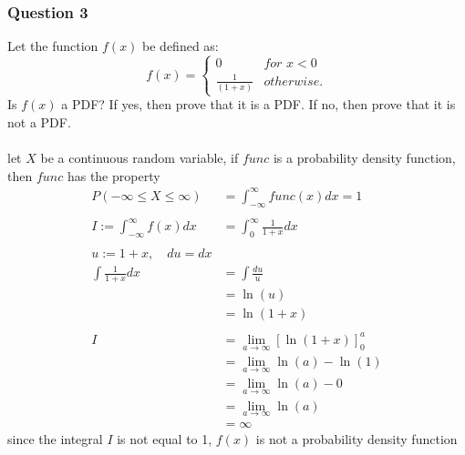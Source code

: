 \documentclass[12pt, border = 4pt, multi]{article} %
\begin{document}
\subsubsection*{Question 3}
Let the function $f(x)$ be defined as: 
\begin{equation}
    f(x) = 
    \left\{ \begin{array}{cl}
    0 & for \,\, x < 0 \\ 
\frac{1}{(1+x)} & otherwise.
\end{array} \right.
\end{equation}
Is $f(x)$ a PDF? If yes, then 
prove that it is a PDF. 
If no, then 
prove that it is not a PDF.\\
\\
let $X$ be a continuous random variable, if $func$ is a probability density function, then $func$ has the property
\begin{align*}
P(-\infty \leq X \leq \infty) &= \int_{-\infty} ^ {\infty} func(x) dx = 1\\
\\
I := \int_{-\infty} ^ {\infty} f(x) dx &= \int_0 ^ {\infty} \frac{1}{1 + x} dx\\
\\
u := 1 + x, \quad du = dx\\
\int \frac{1}{1 + x} dx &= \int \frac{du}{u}\\
&= \ln(u)\\
&= \ln(1 + x)\\
\\
I &= \lim_{a \rightarrow \infty}[\ln(1 + x)]_0 ^ {a}\\
&= \lim_{a \rightarrow \infty}\ln(a) - \ln(1)\\
&= \lim_{a \rightarrow \infty}\ln(a) - 0\\
&= \lim_{a \rightarrow \infty}\ln(a)\\
&= \infty
\end{align*}
since the integral $I$ is not equal to 1, $f(x)$ is not a probability density function\\
\newpage
\noindent
\end{document}
